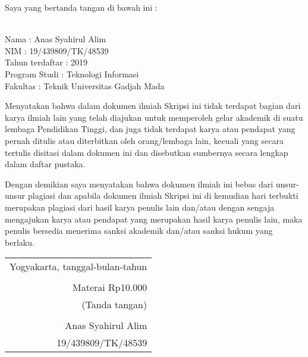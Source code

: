 \noindent Saya yang bertanda tangan di bawah ini :

\vspace{-1em}

\begin{tabbing}
\hspace{40mm} \= \\ %
\noindent Nama \> : Anas Syahirul Alim\\[\parskip]
\noindent NIM \> :  19/439809/TK/48539\\[\parskip]
\noindent Tahun terdaftar \> :  2019\\[\parskip]
\noindent Program Studi \> :  Teknologi Informasi\\[\parskip]
\noindent Fakultas \> : Teknik Universitas Gadjah Mada
\end{tabbing}

\noindent Menyatakan bahwa dalam dokumen ilmiah Skripsi ini tidak terdapat bagian dari karya ilmiah lain yang telah diajukan untuk memperoleh gelar akademik di suatu lembaga Pendidikan Tinggi, dan juga tidak terdapat karya atau pendapat yang pernah ditulis atau diterbitkan oleh orang/lembaga lain, kecuali yang secara tertulis disitasi dalam dokumen ini dan disebutkan sumbernya secara lengkap dalam daftar pustaka.

\noindent Dengan demikian saya menyatakan bahwa dokumen ilmiah ini bebas dari unsur-unsur plagiasi dan apabila dokumen ilmiah Skripsi ini di kemudian hari terbukti merupakan plagiasi dari hasil karya penulis lain dan/atau dengan sengaja mengajukan karya atau pendapat yang merupakan hasil karya penulis lain, maka penulis bersedia menerima sanksi akademik dan/atau sanksi hukum yang berlaku.


\begin{flushright}
	\begin{tabular}{r}
		Yogyakarta, tanggal-bulan-tahun \\
		\vspace{0.1cm} \\
		\tiny{Materai Rp10.000} \\
		\tiny{(Tanda tangan)} \\	
		\vspace{0.1cm} \\
		Anas Syahirul Alim \\ 19/439809/TK/48539
	\end{tabular}
\end{flushright}